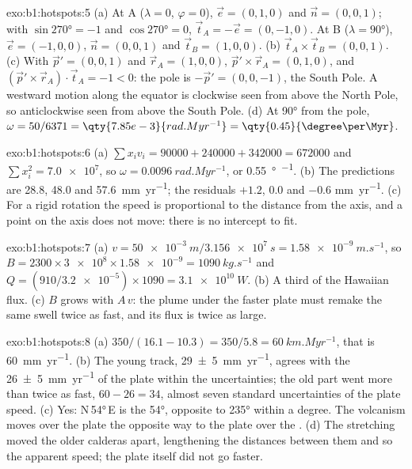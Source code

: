 \begin{solution}{exo:b1:hotspots:5}
(a) At A ($\lambda = 0$, $\varphi = 0$), $\vec e = (0, 1, 0)$ and
$\vec n = (0, 0, 1)$; with $\sin\ang{270} = -1$ and $\cos\ang{270} = 0$,
$\vec t_A = -\vec e = (0, -1, 0)$. At B ($\lambda = \ang{90}$),
$\vec e = (-1, 0, 0)$, $\vec n = (0, 0, 1)$ and $\vec t_B = (1, 0, 0)$.
(b) $\vec t_A\times\vec t_B = (0, 0, 1)$. (c) With $\vec p' = (0, 0, 1)$ and
$\vec r_A = (1, 0, 0)$, $\vec p'\times\vec r_A = (0, 1, 0)$, and
$(\vec p'\times\vec r_A)\cdot\vec t_A = -1 < 0$: the pole is
$-\vec p' = (0, 0, -1)$, the South Pole. A westward motion along the equator
is clockwise seen from above the North Pole, so anticlockwise seen from above
the South Pole. (d) At \ang{90} from the pole, $\omega = 50/6371 =
\qty{7.85e-3}{rad.Myr^{-1}} = \qty{0.45}{\degree\per\Myr}$.
\end{solution}

\begin{solution}{exo:b1:hotspots:6}
(a) $\sum x_i v_i = 90000 + 240000 + 342000 = \num{672000}$ and
$\sum x_i^2 = \num{7.0e7}$, so $\omega = \qty{0.0096}{rad.Myr^{-1}}$, or
\qty{0.55}{\degree\per\Myr}. (b) The predictions are 28.8, 48.0 and
\qty{57.6}{mm.yr^{-1}}; the residuals $+1.2$, $0.0$ and $-0.6$
\unit{mm.yr^{-1}}. (c) For a rigid rotation the speed is proportional to the
distance from the axis, and a point on the axis does not move: there is no
intercept to fit.
\end{solution}

\begin{solution}{exo:b1:hotspots:7}
(a) $v = \qty{50e-3}{m}/\qty{3.156e7}{s} = \qty{1.58e-9}{m.s^{-1}}$, so
$B = 2300\times\num{3e8}\times\num{1.58e-9} = \qty{1090}{kg.s^{-1}}$ and
$Q = (910/\num{3.2e-5})\times1090 = \qty{3.1e10}{W}$. (b) A third of the
Hawaiian flux. (c) $B$ grows with $A\,v$: the plume under the faster plate
must remake the same swell twice as fast, and its flux is twice as large.
\end{solution}

\begin{solution}{exo:b1:hotspots:8}
(a) $350/(16.1 - 10.3) = 350/5.8 = \qty{60}{km.Myr^{-1}}$, that is
\qty{60}{mm.yr^{-1}}. (b) The young track, \qty{29 \pm 5}{mm.yr^{-1}}, agrees
with the \qty{26 \pm 5}{mm.yr^{-1}} of the plate within the uncertainties; the
old part went more than twice as fast, $60 - 26 = 34$, almost seven standard
uncertainties of the plate speed. (c) Yes: N\,\ang{54}\,E is the 
\ang{54}, opposite to \ang{235} within a degree. The volcanism moves over the
plate the opposite way to the plate over the . (d) The stretching moved
the older calderas apart, lengthening the distances between them and so the
apparent speed; the plate itself did not go faster.
\end{solution}


